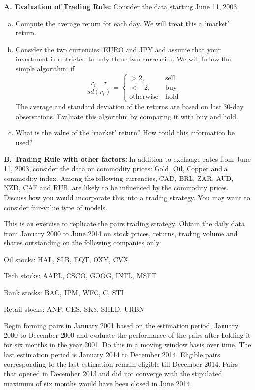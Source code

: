 \indent\textbf{A. Evaluation of Trading Rule:} Consider the data starting June 11, 2003.
	\begin{enumerate}[(a)]
	\item Compute the average return for each day. We will treat this a `market' return.
	\item Consider the two currencies: EURO and JPY and assume that your investment is restricted to only these two currencies. We will follow the simple algorithm: if 
	\[
	\frac{r_i - \overline{r}}{sd(r_i)}=
	\begin{cases}
	>2, & \text{sell} \\
	< -2, & \text{buy} \\
	\text{otherwise}, & \text{hold}
	\end{cases}
	\]
The average and standard deviation of the returns are based on last 30-day observations. Evaluate this algorithm by comparing it with buy and hold.
	\item What is the value of the `market' return? How could this information be used?
\end{enumerate}


\textbf{B. Trading Rule with other factors:} In addition to exchange rates from June 11, 2003, consider the data on commodity prices: Gold, Oil, Copper and a commodity index. Among the following currencies, CAD, BRL, ZAR, AUD, NZD, CAF and RUB, are likely to be influenced by the commodity prices. Discuss how you would incorporate this into a trading strategy. You may want to consider fair-value type of models.\twomedskip


\prob This is an exercise to replicate the pairs trading strategy. Obtain the daily data from January 2000 to June 2014 on stock prices, returns, trading volume and shares outstanding on the following companies only: \twomedskip

\indent Oil stocks: HAL, SLB, EQT, OXY, CVX \twomedskip

\indent Tech stocks: AAPL, CSCO, GOOG, INTL, MSFT \twomedskip

\indent Bank stocks: BAC, JPM, WFC, C, STI \twomedskip

\indent Retail stocks: ANF, GES, SKS, SHLD, URBN \twomedskip

Begin forming pairs in January 2001 based on the estimation period, January 2000 to December 2000 and evaluate the performance of the pairs after holding it for six months in the year 2001. Do this in a moving window basis over time. The last estimation period is January 2014 to December 2014. Eligible pairs corresponding to the last estimation remain eligible till December 2014. Pairs that opened in December 2013 and did not converge with the stipulated maximum of six months would have been closed in June 2014.



